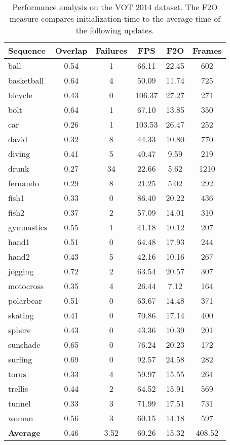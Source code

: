 \documentclass[runningheads]{llncs}
\begin{document}
\begin{table}
\begin{center}
\begin{tabular}{l c c c c c}
\hline 
{\bf Sequence} & {\bf Overlap} & {\bf Failures} & {\bf FPS} & {\bf F2O} & {\bf Frames} \\
\hline 
ball & 0.54 & 1 & 66.11 & 22.45 & 602 \\
basketball & 0.64 & 4 & 50.09 & 11.74 & 725 \\
bicycle & 0.43 & 0 & 106.37 & 27.27 & 271 \\
bolt & 0.64 & 1 & 67.10 & 13.85 & 350 \\
car & 0.26 & 1 & 103.53 & 26.47 & 252 \\
david & 0.32 & 8 & 44.33 & 10.80 & 770 \\
diving & 0.41 & 5 & 40.47 & 9.59 & 219 \\
drunk & 0.27 & 34 & 22.66 & 5.62 & 1210 \\
fernando & 0.29 & 8 & 21.25 & 5.02 & 292 \\
fish1 & 0.33 & 0 & 86.40 & 20.22 & 436 \\
fish2 & 0.37 & 2 & 57.09 & 14.01 & 310 \\
gymnastics & 0.55 & 1 & 41.18 & 10.12 & 207 \\
hand1 & 0.51 & 0 & 64.48 & 17.93 & 244 \\
hand2 & 0.43 & 5 & 42.16 & 10.16 & 267 \\
jogging & 0.72 & 2 & 63.54 & 20.57 & 307 \\
motocross & 0.35 & 4 & 26.44 & 7.12 & 164 \\
polarbear & 0.51 & 0 & 63.67 & 14.48 & 371 \\
skating & 0.41 & 0 & 70.86 & 17.14 & 400 \\
sphere & 0.43 & 0 & 43.36 & 10.39 & 201 \\
sunshade & 0.65 & 0 & 76.24 & 20.23 & 172 \\
surfing & 0.69 & 0 & 92.57 & 24.58 & 282 \\
torus & 0.33 & 4 & 59.97 & 15.55 & 264 \\
trellis & 0.44 & 2 & 64.52 & 15.91 & 569 \\
tunnel & 0.33 & 3 & 71.99 & 17.51 & 731 \\
woman & 0.56 & 3 & 60.15 & 14.18 & 597 \\
\hline 
{\bf Average} & 0.46 & 3.52 & 60.26 & 15.32 & 408.52 \\
\end{tabular}
\end{center}
\caption{Performance analysis on the VOT 2014 dataset. The F2O measure compares initialization time to the average time of the following updates.}
\label{tbl_particle_filter_performance_analysis}
\end{table}
    
\end{document}
